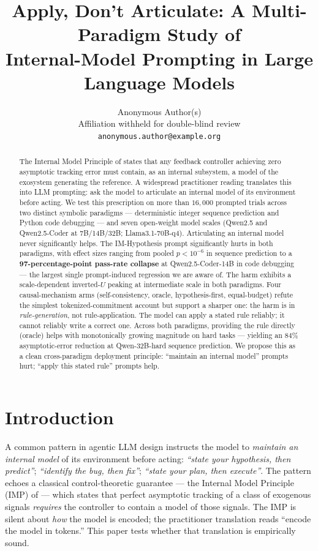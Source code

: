 \documentclass{article}
\title{\textbf{Apply, Don't Articulate: A Multi-Paradigm Study of\\
Internal-Model Prompting in Large Language Models}}
\author{%
  Anonymous Author(s)\\
  Affiliation withheld for double-blind review\\
  \texttt{anonymous.author@example.org}
}
\date{}
\begin{document}
\maketitle

\begin{abstract}
The Internal Model Principle of \citet{francis1976internal} states
that any feedback controller achieving zero asymptotic tracking
error must contain, as an internal subsystem, a model of the
exosystem generating the reference.  A widespread practitioner
reading translates this into LLM prompting: ask the model to
articulate an internal model of its environment before acting.
We test this prescription on more than $16{,}000$ prompted trials
across two distinct symbolic paradigms --- deterministic integer
sequence prediction and Python code debugging --- and seven
open-weight model scales (Qwen2.5 and Qwen2.5-Coder at
7B/14B/32B; Llama3.1-70B-q4).
Articulating an internal model never significantly helps.  The
IM-Hypothesis prompt significantly hurts in both paradigms, with
effect sizes ranging from pooled $p < 10^{-6}$ in sequence
prediction to a \textbf{97-percentage-point pass-rate collapse} at
Qwen2.5-Coder-14B in code debugging --- the largest single
prompt-induced regression we are aware of.  The harm exhibits a
scale-dependent inverted-$U$ peaking at intermediate scale in both
paradigms.  Four causal-mechanism arms (self-consistency, oracle,
hypothesis-first, equal-budget) refute the simplest
tokenized-commitment account but support a sharper one: the harm
is in \emph{rule-generation}, not rule-application.  The model can
apply a stated rule reliably; it cannot reliably write a correct
one.  Across both paradigms, providing the rule directly (oracle)
helps with monotonically growing magnitude on hard tasks ---
yielding an $84\%$ asymptotic-error reduction at Qwen-32B-hard
sequence prediction.  We propose this as a clean cross-paradigm
deployment principle:  ``maintain an internal model'' prompts
hurt; ``apply this stated rule'' prompts help.
\end{abstract}

\section{Introduction}
\label{sec:intro}

A common pattern in agentic LLM design instructs the model to
\emph{maintain an internal model} of its environment before acting:
\textit{``state your hypothesis, then predict''}; \textit{``identify
the bug, then fix''}; \textit{``state your plan, then execute''}.
The pattern echoes a classical control-theoretic guarantee --- the
Internal Model Principle (IMP) of \citet{francis1976internal} ---
which states that perfect asymptotic tracking of a class of
exogenous signals \emph{requires} the controller to contain a model
of those signals.  The IMP is silent about \emph{how} the model is
encoded; the practitioner translation reads ``encode the model in
tokens.''  This paper tests whether that translation is empirically
sound.
\end{document}
